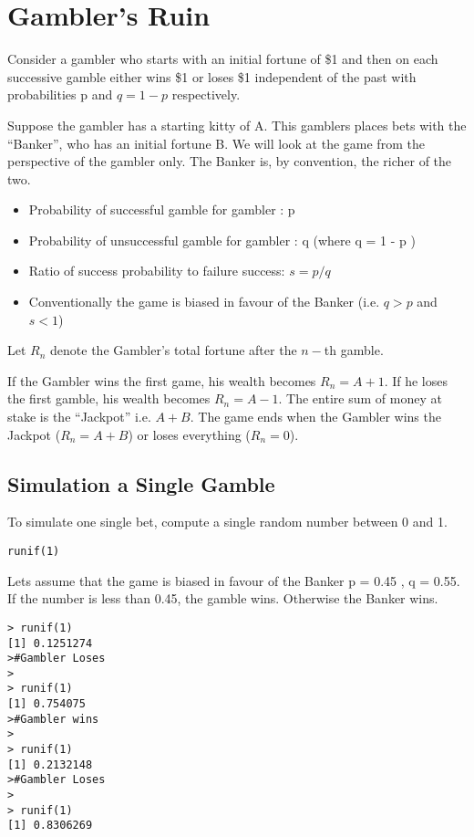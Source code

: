 \section*{Gambler's Ruin}
Consider a gambler who starts with an initial fortune of \$1 and then on each successive gamble
either wins \$1 or loses \$1 independent of the past with probabilities p and $q = 1-p$ respectively.

Suppose the gambler has a starting kitty of A. 
This gamblers places bets with the “Banker”, who has an initial fortune B. We will look at the game from the perspective of the gambler only.
The Banker is, by convention, the richer of the two.

\begin{itemize}
\item Probability of successful gamble for gambler : p
\item Probability of unsuccessful gamble for gambler : q 	(where q =  1 - p )
\item Ratio of success probability to failure success:	$s = p / q$
\item Conventionally the game is biased in favour of the Banker (i.e. $q>p$ and $s<1$)
\end{itemize}

Let $R_n$ denote the Gambler’s total fortune after the $n-$th gamble.

If the Gambler wins the first game, his wealth becomes $R_n =A+1$.
If he loses the first gamble, his wealth becomes $R_n = A-1$.
The entire sum of money at stake is the “Jackpot” i.e.   $A+B$.
The game ends when the Gambler wins the Jackpot ($R_n = A+B$) or loses everything ($R_n = 0$).


\subsection{Simulation a Single Gamble}




To simulate one single bet, compute a single random number between 0 and 1.
\begin{framed}
\begin{verbatim}
runif(1)
\end{verbatim}
\end{framed}

Lets assume that the game is biased in favour of the Banker
p = 0.45 , q = 0.55.
If the number is less than 0.45, the gamble wins. Otherwise the Banker wins.

\begin{framed}
\begin{verbatim}
> runif(1)
[1] 0.1251274
>#Gambler Loses
>
> runif(1)
[1] 0.754075
>#Gambler wins
>
> runif(1)
[1] 0.2132148
>#Gambler Loses
>
> runif(1)
[1] 0.8306269
\end{verbatim}
\end{framed}


